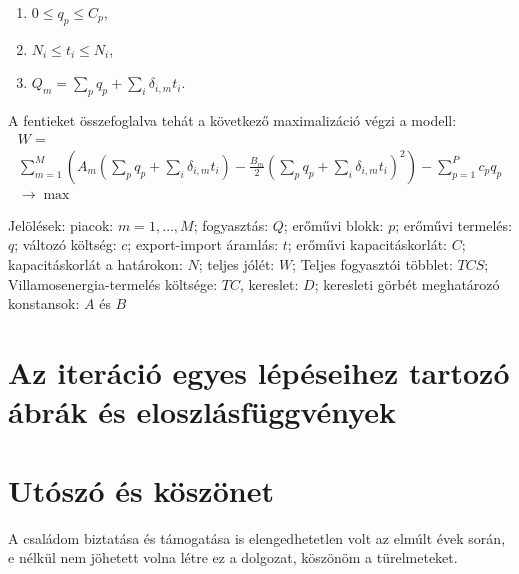 \documentclass[twoside, magyar, showtrims]{corvinusphd}
\begin{document}
\begin{enumerate}
    \item $0\leq q_p\leq C_p$,
    \item $N_i\leq t_i\leq N_i$,
    \item $Q_m=\sum_{p}q_p+\sum_i\delta_{i,m}t_i.$
\end{enumerate}
A fentieket összefoglalva tehát a következő maximalizáció végzi a modell:
\begin{multline}
    W=\\
    \sum_{m=1}^M\left( A_m\left( \sum_pq_p+\sum_i\delta_{i,m}t_i \right)-\frac{B_m}{2}\left( \sum_pq_p+\sum_i\delta_{i,m}t_i \right)^2 \right)
    -
    \sum_{p=1}^Pc_pq_p\\
    \rightarrow \max
\end{multline}

 
Jelölések: piacok: $m=1,\ldots,M$; fogyasztás: $Q$; erőművi blokk: $p$;
erőművi termelés: $q$; változó költség: $c$; export-import áramlás: $t$;
erőművi kapacitáskorlát: $C$; kapacitáskorlát a határokon: $N$;
teljes jólét: $W$; Teljes fogyasztói többlet: $TCS$;
Villamosenergia-termelés költsége: $TC$, kereslet: $D$;
keresleti görbét meghatározó konstansok: $A$ és $B$


\chapter{Az iteráció egyes lépéseihez tartozó ábrák és eloszlásfüggvények}\label{app:2}

\renewcommand{\indexname}{Rövidítések jegyzéke}
\printindex

\chapter*{Utószó és köszönet}
\scwords 
A családom biztatása és támogatása is elengedhetetlen volt
az elmúlt évek során, e nélkül nem jöhetett
volna létre ez a dolgozat, köszönöm a türelmeteket. 
\end{document}
